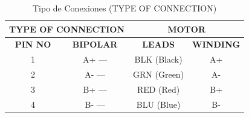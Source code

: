 \begin{table}[H]
\centering
\caption{Tipo de Conexiones (TYPE OF CONNECTION)}
\label{tab:motor-tipo-conexiones}
\begin{tabular}{|c|c|c|c|}
\hline
\multicolumn{2}{|c|}{\textbf{TYPE OF CONNECTION}} & \multicolumn{2}{c|}{\textbf{MOTOR}} \\
\hline
\textbf{PIN NO} & \textbf{BIPOLAR} & \textbf{LEADS} & \textbf{WINDING} \\
\hline
1 & A+ --- & BLK (Black) & A+ \\
\hline
2 & A- --- & GRN (Green) & A- \\
\hline
3 & B+ --- & RED (Red) & B+ \\
\hline
4 & B- --- & BLU (Blue) & B- \\
\hline
\end{tabular}
\end{table}